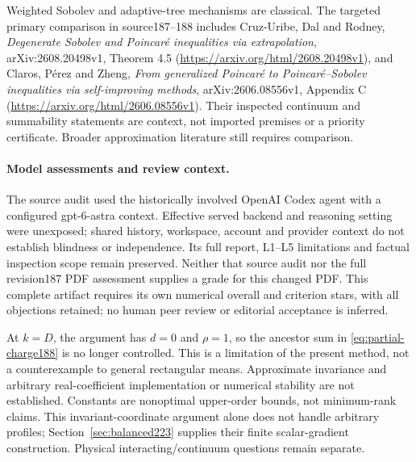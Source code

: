 Weighted Sobolev and adaptive-tree mechanisms are classical. The targeted
primary comparison in source187--188 includes Cruz-Uribe, Dal and Rodney,
\emph{Degenerate Sobolev and Poincar\'e inequalities via extrapolation},
arXiv:2608.20498v1, Theorem 4.5
(\url{https://arxiv.org/html/2608.20498v1}), and Claros, P\'erez and Zheng,
\emph{From generalized Poincar\'e to Poincar\'e--Sobolev inequalities via
self-improving methods}, arXiv:2606.08556v1, Appendix C
(\url{https://arxiv.org/html/2606.08556v1}). Their inspected continuum and
summability statements are context, not imported premises or a priority
certificate. Broader approximation literature still requires comparison.

\paragraph{Model assessments and review context.}
The source audit used the historically involved OpenAI Codex agent with a
configured gpt-6-astra context. Effective served backend and reasoning setting
were unexposed; shared history, workspace, account and provider context do not
establish blindness or independence. Its full report, L1--L5 limitations and
factual inspection scope remain preserved. Neither that source audit nor the
full revision187 PDF assessment supplies a grade for this changed PDF. This
complete artifact requires its own numerical overall and criterion stars,
with all objections retained; no human peer review or editorial acceptance
is inferred.

At $k=D$, the argument has $d=0$ and $\rho=1$, so the ancestor sum in
\eqref{eq:partial-charge188} is no longer controlled. This is a limitation
of the present method, not a counterexample to general rectangular means.
Approximate invariance and arbitrary real-coefficient implementation or
numerical stability are not established. Constants are nonoptimal upper-order
bounds, not minimum-rank claims. This invariant-coordinate argument alone does not handle arbitrary profiles;
Section~\ref{sec:balanced223} supplies their finite scalar-gradient construction.
Physical interacting/continuum questions remain separate.
